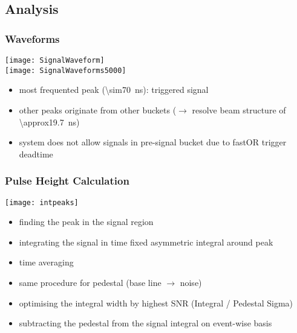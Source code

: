 
\subsection{Analysis}
\begin{frame}
	\frametitle{Waveforms}
	\vspace*{-20pt}
	\begin{center}
		\texttt{[image: SignalWaveform]}\\
		\texttt{[image: SignalWaveforms5000]}
	\end{center}
	\begin{itemize}
		\item most frequented peak (\SI{\sim70}{ns}): triggered signal
		\item other peaks originate from other buckets ($\rightarrow$ resolve beam structure of \SI{\approx19.7}{ns})
		\item system does not allow signals in pre-signal bucket due to fastOR trigger deadtime
	\end{itemize}
\end{frame}
\begin{frame}
	\frametitle{Pulse Height Calculation}
	\vspace*{-5pt}
	\begin{center}
		\texttt{[image: intpeaks]}\\
	\end{center}
	\vspace*{-5pt}
	\begin{itemize}
		\setlength{\itemsep}{\fill}
		\item finding the peak in the signal region
		\item integrating the signal in time fixed asymmetric integral around peak
		\item time averaging
		\item same procedure for pedestal (base line $\rightarrow$ noise)
		\item optimising the integral width by highest SNR (Integral / Pedestal Sigma)
		\item subtracting the pedestal from the signal integral on event-wise basis 
	\end{itemize}
\end{frame}
